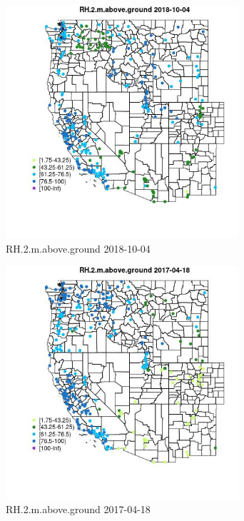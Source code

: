 \begin{figure} 
\centering  
\includegraphics[width=0.77\textwidth]{Code_Outputs/Report_ML_input_PM25_Step4_part_f_de_duplicated_aves_prioritize_24hr_obswNAs_MapObsRH2maboveground2018-10-04.jpg} 
\caption{\label{fig:Report_ML_input_PM25_Step4_part_f_de_duplicated_aves_prioritize_24hr_obswNAsMapObsRH2maboveground2018-10-04}RH.2.m.above.ground 2018-10-04} 
\end{figure} 
 

\begin{figure} 
\centering  
\includegraphics[width=0.77\textwidth]{Code_Outputs/Report_ML_input_PM25_Step4_part_f_de_duplicated_aves_prioritize_24hr_obswNAs_MapObsRH2maboveground2017-04-18.jpg} 
\caption{\label{fig:Report_ML_input_PM25_Step4_part_f_de_duplicated_aves_prioritize_24hr_obswNAsMapObsRH2maboveground2017-04-18}RH.2.m.above.ground 2017-04-18} 
\end{figure} 
 

